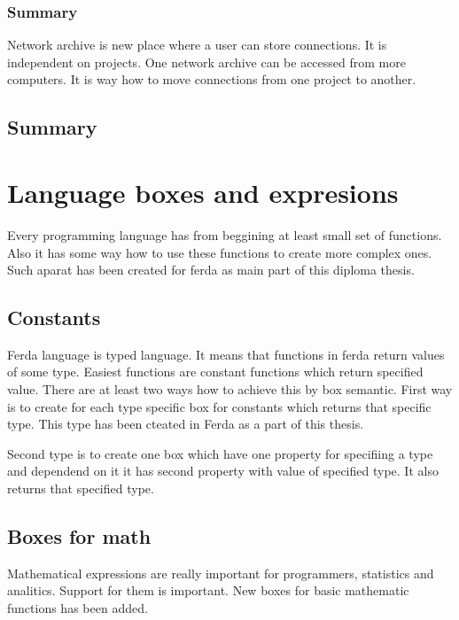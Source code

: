 \documentclass{article}
\begin{document}
\subsubsection{Summary}
Network archive is new place where a user can store connections. It is independent on projects. One network archive can be accessed from more computers. It is way how to move connections from one project to another.

\subsection{Summary}

\section{Language boxes and expresions}
Every programming language has from beggining at least small set of functions. Also it has some way how to use these functions to create more complex ones. Such aparat has been created for ferda as main part of this diploma thesis.

\subsection{Constants}
Ferda language is typed language. It means that functions in ferda return values of some type. Easiest functions are constant functions which return specified value. There are at least two ways how to achieve this by box semantic. First way is to create for each type specific box for constants which returns that specific type. This type has been cteated in Ferda as a part of this thesis.

Second type is to create one box which have one property for specifiing a type and dependend on it it has second property with value of specified type. It also returns that specified type.

\subsection{Boxes for math}
Mathematical expressions are really important for programmers, statistics and analitics. Support for them is important. New boxes for basic mathematic functions has been added. 
\end{document}
